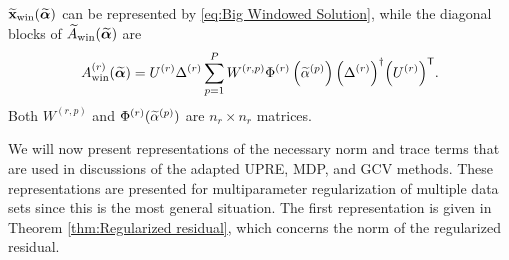 \documentclass[12pt]{article}
\begin{document}
$\widetilde{\mathbf{x}}_{\text{win}}(\widetilde{\bm{\alpha}})$ can be represented by \eqref{eq:Big Windowed Solution}, while the diagonal blocks of $\widetilde{A}_{\text{win}}(\widetilde{\bm{\alpha}})$ are
\begin{equation}
    A_{\text{win}}^{(r)}(\widetilde{\bm{\alpha}})
    = U^{(r)}\Delta^{(r)}\sum_{p=1}^{P}W^{(r,p)}\Phi^{(r)}\left(\widetilde{\alpha}^{(p)}\right){\left(\Delta^{(r)}\right)}^\dagger{\left(U^{(r)}\right)}^\mathsf{T}. \label{eq:Windowed Big Influence Diagonals}
\end{equation}
Both $W^{(r,p)}$ and $\Phi^{(r)}(\widetilde{\alpha}^{(p)})$ are $n_r \times n_r$ matrices. \par
We will now present representations of the necessary norm and trace terms that are used in discussions of the adapted UPRE, MDP, and GCV methods. These representations are presented for multiparameter regularization of multiple data sets since this is the most general situation. The first representation is given in Theorem \ref{thm:Regularized residual}, which concerns the norm of the regularized residual.
\end{document}
